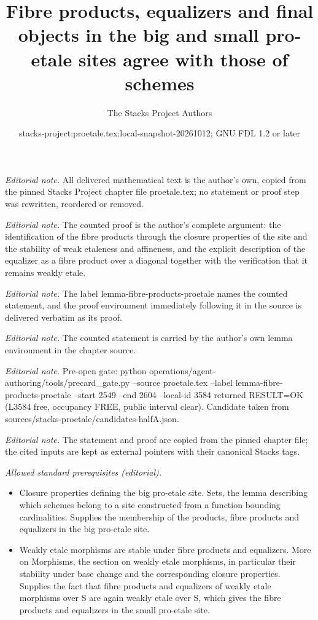 \documentclass[10pt,a4paper]{amsart}
\title{Fibre products, equalizers and final objects in the big and small pro-etale sites agree with those of schemes}
\author{The Stacks Project Authors}
\date{stacks-project:proetale.tex:local-snapshot-20261012; GNU FDL 1.2 or later}
\theoremstyle{plain}
\theoremstyle{definition}
\theoremstyle{remark}
\numberwithin{equation}{subsection}
\begin{document}
\maketitle
\noindent\textit{Editorial note.} All delivered mathematical text is the author's own, copied from the pinned Stacks Project chapter file proetale.tex; no statement or proof step was rewritten, reordered or removed.\par\medskip
\noindent\textit{Editorial note.} The counted proof is the author's complete argument: the identification of the fibre products through the closure properties of the site and the stability of weak etaleness and affineness, and the explicit description of the equalizer as a fibre product over a diagonal together with the verification that it remains weakly etale.\par\medskip
\noindent\textit{Editorial note.} The label lemma-fibre-products-proetale names the counted statement, and the proof environment immediately following it in the source is delivered verbatim as its proof.\par\medskip
\noindent\textit{Editorial note.} The counted statement is carried by the author's own lemma environment in the chapter source.\par\medskip
\noindent\textit{Editorial note.} Pre-open gate: python operations/agent-authoring/tools/precard\_gate.py --source proetale.tex --label lemma-fibre-products-proetale --start 2549 --end 2604 --local-id 3584 returned RESULT=OK (L3584 free, occupancy FREE, public interval clear). Candidate taken from sources/stacks-proetale/candidates-halfA.json.\par\medskip
\noindent\textit{Editorial note.} The statement and proof are copied from the pinned chapter file; the cited inputs are kept as external pointers with their canonical Stacks tags.\par\medskip
\noindent\textit{Allowed standard prerequisites (editorial).}\begin{itemize}
\item Closure properties defining the big pro-etale site. Sets, the lemma describing which schemes belong to a site constructed from a function bounding cardinalities. Supplies the membership of the products, fibre products and equalizers in the big pro-etale site.
\item Weakly etale morphisms are stable under fibre products and equalizers. More on Morphisms, the section on weakly etale morphisms, in particular their stability under base change and the corresponding closure properties. Supplies the fact that fibre products and equalizers of weakly etale morphisms over S are again weakly etale over S, which gives the fibre products and equalizers in the small pro-etale site.
\end{itemize}\medskip
\end{document}
